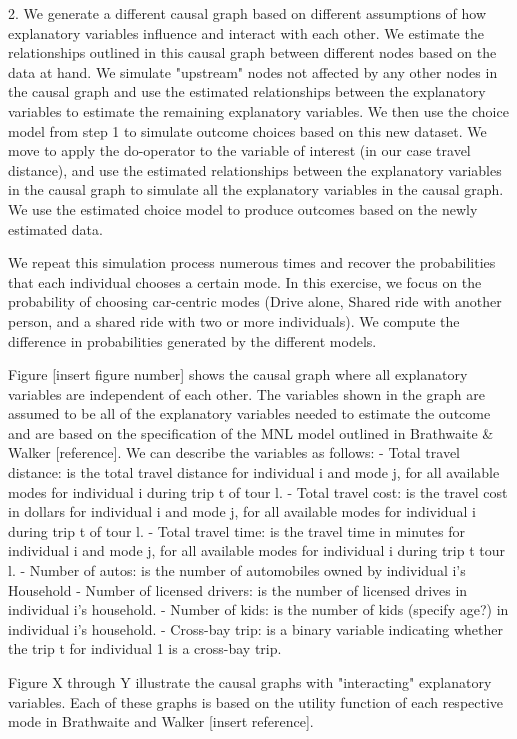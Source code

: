 2. We generate a different causal graph based on different assumptions of how explanatory variables influence and interact with each other.
We estimate the relationships outlined in this causal graph between different nodes based on the data at hand.
We simulate "upstream" nodes not affected by any other nodes in the causal graph and use the estimated relationships between the explanatory variables to estimate the remaining explanatory variables.
We then use the choice model from step 1 to simulate outcome choices based on this new dataset.
We move to apply the do-operator to the variable of interest (in our case travel distance), and use the estimated relationships between the explanatory variables in the causal graph to simulate all the explanatory variables in the causal graph.
We use the estimated choice model to produce outcomes based on the newly estimated data. 

We repeat this simulation process numerous times and recover the probabilities that each individual chooses a certain mode. 
In this exercise, we focus on the probability of choosing car-centric modes (Drive alone, Shared ride with another person, and a shared ride with two or more individuals).
We compute the difference in probabilities generated by the different models.

Figure [insert figure number] shows the causal graph where all explanatory variables are independent of each other.
The variables shown in the graph are assumed to be all of the explanatory variables needed to estimate the outcome and are based on the specification of the MNL model outlined in Brathwaite & Walker [reference].
We can describe the variables as follows:
- Total travel distance: is the total travel distance for individual i and mode j, for all available modes for individual i during trip t of tour l.
- Total travel cost: is the travel cost in dollars for individual i and mode j, for all available modes for individual i during trip t of tour l.
- Total travel time: is the travel time in minutes for individual i and mode j, for all available modes for individual i during trip t tour l.
- Number of autos: is the number of automobiles owned by individual i's Household
- Number of licensed drivers: is the number of licensed drives in individual i's household.
- Number of kids: is the number of kids (specify age?) in individual i's household.
- Cross-bay trip: is a binary variable indicating whether the trip t for individual 1 is a cross-bay trip.

Figure X through Y illustrate the causal graphs with "interacting" explanatory variables.
Each of these graphs is based on the utility function of each respective mode in Brathwaite and Walker [insert reference].
\blindtext[2]

\blindtext[2]